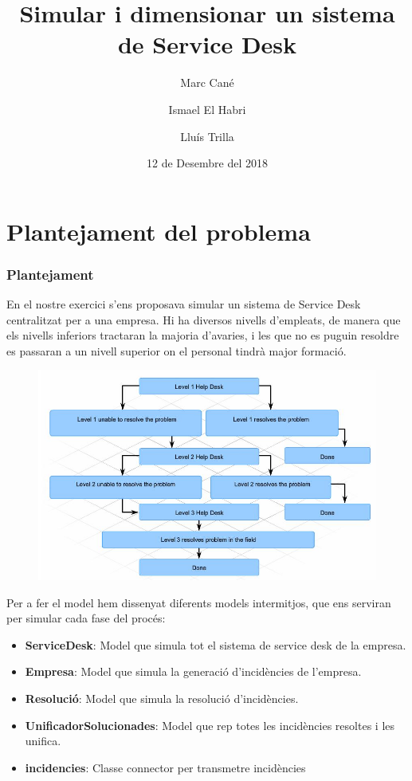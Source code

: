 \documentclass[8pt]{beamer}
\title{Simular i dimensionar un sistema de Service Desk}
\author{Marc Cané \and Ismael El Habri \and Lluís Trilla}
\date[KPT 2004] %
{12 de Desembre del 2018}
\begin{document}
\frame{\titlepage}

\section[Plantejament]{Plantejament del problema}
  \begin{frame}
    \frametitle{Plantejament}
    En el nostre exercici s'ens proposava simular un sistema de Service Desk centralitzat per a una empresa. Hi ha diversos nivells d'empleats, de manera que els nivells inferiors tractaran la majoria d'avaries, i les que no es puguin resoldre es passaran a un nivell superior on el personal tindrà major formació.
    \begin{figure}[h!]
      \includegraphics[width=\linewidth]{help-desk-levels.jpg}
      \label{fig:plot1}
    \end{figure}
  \end{frame}
  \begin{frame}
  Per a fer el model hem dissenyat diferents models intermitjos, que ens serviran per simular cada fase del procés:
\begin{itemize}
  \item \textbf{ServiceDesk}: Model que simula tot el sistema de service desk de la empresa.
  \item \textbf{Empresa}: Model que simula la generació d'incidències de l'empresa.
  \item \textbf{Resolució}: Model que simula la resolució d'incidències.
  \item \textbf{UnificadorSolucionades}: Model que rep totes les incidències resoltes i les unifica.
  \item \textbf{incidencies}: Classe connector per transmetre incidències 
\end{itemize}
  \end{frame}
\end{document}
